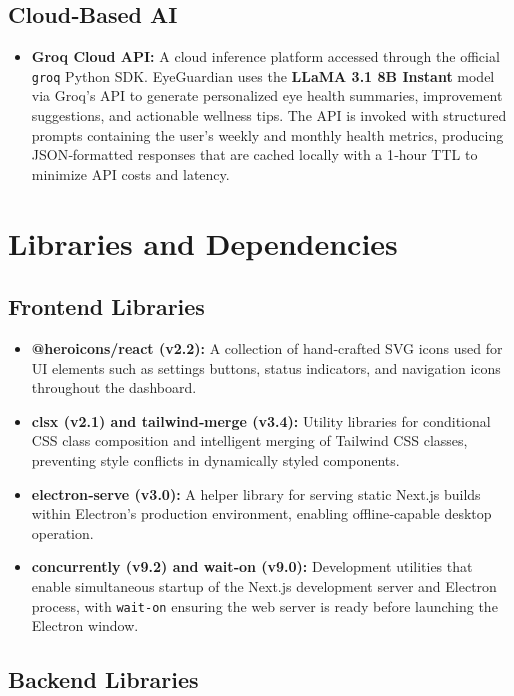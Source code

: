 \documentclass[12pt]{report}
\begin{document}
\subsection{Cloud‑Based AI}

\begin{itemize}
    \item \textbf{Groq Cloud API:} A cloud inference platform accessed through the official \texttt{groq} Python SDK. EyeGuardian uses the \textbf{LLaMA 3.1 8B Instant} model via Groq's API to generate personalized eye health summaries, improvement suggestions, and actionable wellness tips. The API is invoked with structured prompts containing the user's weekly and monthly health metrics, producing JSON‑formatted responses that are cached locally with a 1‑hour TTL to minimize API costs and latency.
\end{itemize}

\section{Libraries and Dependencies}

\subsection{Frontend Libraries}

\begin{itemize}
    \item \textbf{@heroicons/react (v2.2):} A collection of hand‑crafted SVG icons used for UI elements such as settings buttons, status indicators, and navigation icons throughout the dashboard.
    \item \textbf{clsx (v2.1) and tailwind‑merge (v3.4):} Utility libraries for conditional CSS class composition and intelligent merging of Tailwind CSS classes, preventing style conflicts in dynamically styled components.
    \item \textbf{electron‑serve (v3.0):} A helper library for serving static Next.js builds within Electron's production environment, enabling offline‑capable desktop operation.
    \item \textbf{concurrently (v9.2) and wait‑on (v9.0):} Development utilities that enable simultaneous startup of the Next.js development server and Electron process, with \texttt{wait‑on} ensuring the web server is ready before launching the Electron window.
\end{itemize}

\subsection{Backend Libraries}
\end{document}
